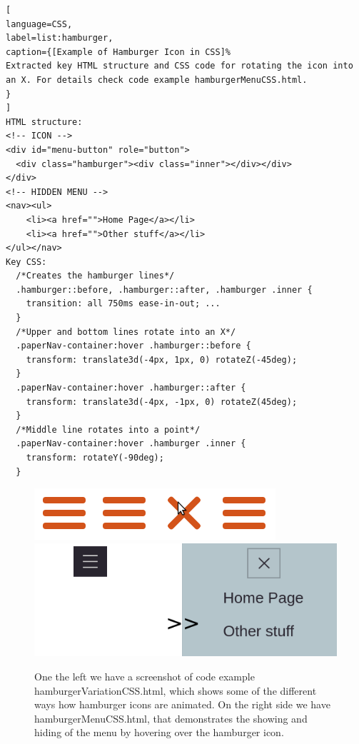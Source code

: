 \begin{lstlisting}[
language=CSS,
label=list:hamburger,
caption={[Example of Hamburger Icon in CSS]%
Extracted key HTML structure and CSS code for rotating the icon into an X. For details check code example hamburgerMenuCSS.html.
}
]
HTML structure:
<!-- ICON -->
<div id="menu-button" role="button">
  <div class="hamburger"><div class="inner"></div></div>
</div>
<!-- HIDDEN MENU -->
<nav><ul>
    <li><a href="">Home Page</a></li>
    <li><a href="">Other stuff</a></li>
</ul></nav>
Key CSS:
  /*Creates the hamburger lines*/
  .hamburger::before, .hamburger::after, .hamburger .inner {
    transition: all 750ms ease-in-out; ...
  }
  /*Upper and bottom lines rotate into an X*/
  .paperNav-container:hover .hamburger::before {
    transform: translate3d(-4px, 1px, 0) rotateZ(-45deg);  
  }
  .paperNav-container:hover .hamburger::after {
    transform: translate3d(-4px, -1px, 0) rotateZ(45deg);  
  }
  /*Middle line rotates into a point*/
  .paperNav-container:hover .hamburger .inner {
    transform: rotateY(-90deg); 
  }\end{lstlisting}

\begin{figure}[h]
\centering
\includegraphics[keepaspectratio,scale=0.5]{images/hamburgerVar.png}
\includegraphics[keepaspectratio,scale=0.5]{images/hamburgerMenu.png}

\caption[Hamburger Examples]{
One the left we have a screenshot of code example hamburgerVariationCSS.html, which shows some of the different ways how hamburger icons are animated. On the right side we have hamburgerMenuCSS.html, that demonstrates the showing and hiding of the menu by hovering over the hamburger icon.
}
\label{fig:hamburger}
\end{figure}



